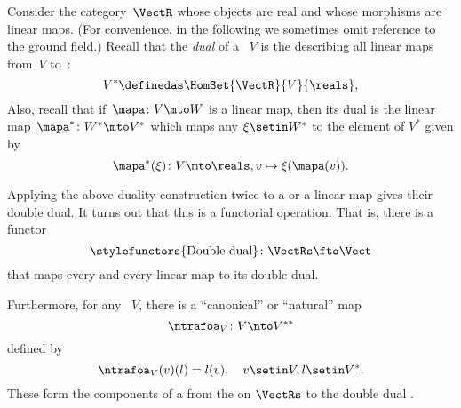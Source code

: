 \begin{example}
    \label{ex:Vect}
    Consider the category~$\VectR$ whose objects are real  and whose morphisms are linear maps.
    (For convenience, in the following we sometimes omit reference to the ground field.)
    Recall that the \emph{dual} of a ~$V$ is the  describing all linear maps from~$V$ to~\reals:
    \begin{equation}
        \label{eq:dual-vector-space}
        V^* \definedas \HomSet{\VectR}{V}{\reals},
    \end{equation}
    Also, recall that if~$\mapa\colon V \mto W$ is a linear map, then its dual is the linear map~$\mapa^* \linebreak[1] \colon W^* \mto V^*$ which maps any $\xi \setin W^*$ to the element of $V^*$ given by
    \begin{equation}
        \mapa^*(\xi) \colon V \mto \reals, v \mapsto \xi(\mapa(v)).
    \end{equation}

    Applying the above duality construction twice to a  or a linear map gives their double dual.
    It turns out that this is a functorial operation.
    That is, there is a functor
    \begin{equation}
        \label{eq:double-dual-functor}
        \text{\stylefunctors{Double dual}}\colon \VectRs \fto \Vect
    \end{equation}
    that maps every  and every linear map to its double dual.

    Furthermore, for any ~$V$, there is a ``canonical'' or ``natural'' map
    \begin{equation}
        \ntrafoa_V \colon V \nto V^{**}
    \end{equation}
    defined by
    \begin{equation}
        \label{eq:natural-trafo-to-double-dual}
        \ntrafoa_V(v)(l) = l(v), \quad v \setin V, l \setin V^*.
    \end{equation}
    These form the components of a  from the  on $\VectRs$ to the double dual .
\end{example}

